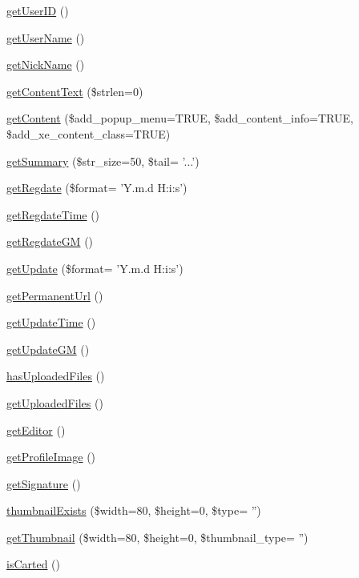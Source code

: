 \begin{DoxyCompactItemize}
\hyperlink{classcommentItem_a5c793e6542e731da5d465c35c77b42fd}{get\-User\-I\-D} ()
\item 
\hyperlink{classcommentItem_a1c35032d37e80ad5018a02787f0091fe}{get\-User\-Name} ()
\item 
\hyperlink{classcommentItem_a097673677cd1c461040cbc9275b7fca9}{get\-Nick\-Name} ()
\item 
\hyperlink{classcommentItem_a5bd758e385068bff00ffc35a0737ff72}{get\-Content\-Text} (\$strlen=0)
\item 
\hyperlink{classcommentItem_afae7151c28cc9066f9c40a010597b25a}{get\-Content} (\$add\-\_\-popup\-\_\-menu=T\-R\-U\-E, \$add\-\_\-content\-\_\-info=T\-R\-U\-E, \$add\-\_\-xe\-\_\-content\-\_\-class=T\-R\-U\-E)
\item 
\hyperlink{classcommentItem_aabe11142b19d831c5e3120e48bb169f7}{get\-Summary} (\$str\-\_\-size=50, \$tail= '...')
\item 
\hyperlink{classcommentItem_acae004be4282c96181e79cc0f3b3adfa}{get\-Regdate} (\$format= 'Y.\-m.\-d H\-:i\-:s')
\item 
\hyperlink{classcommentItem_adb5754f10a245c54a0beb4f6fb22f0e3}{get\-Regdate\-Time} ()
\item 
\hyperlink{classcommentItem_ae5f0203691b6d16a2d99ae40d67adb3f}{get\-Regdate\-G\-M} ()
\item 
\hyperlink{classcommentItem_aa7a413ef04f4c64c779a8bb119a5c214}{get\-Update} (\$format= 'Y.\-m.\-d H\-:i\-:s')
\item 
\hyperlink{classcommentItem_adc6e6a36fd7c02a2f0fecc8a22f9b13b}{get\-Permanent\-Url} ()
\item 
\hyperlink{classcommentItem_a59d0264c1b6842c6a0dfa21a6dfe1edb}{get\-Update\-Time} ()
\item 
\hyperlink{classcommentItem_aab0135e2edd37a47cc390da9b4c79dfa}{get\-Update\-G\-M} ()
\item 
\hyperlink{classcommentItem_abe1774ffe4e8c0f5c14822c5698433da}{has\-Uploaded\-Files} ()
\item 
\hyperlink{classcommentItem_aaa9c1ef5cfd0ce69fd83d8d980360ee5}{get\-Uploaded\-Files} ()
\item 
\hyperlink{classcommentItem_aa27b1c1916b9df510c495655af07bfdf}{get\-Editor} ()
\item 
\hyperlink{classcommentItem_a9baa56f4aa9515c433494778e75c9e85}{get\-Profile\-Image} ()
\item 
\hyperlink{classcommentItem_a97eea3e5359c0ffe84db781d5e5fbff6}{get\-Signature} ()
\item 
\hyperlink{classcommentItem_a1523ec4128cf464d13ca1fb1c2078a0f}{thumbnail\-Exists} (\$width=80, \$height=0, \$type= '')
\item 
\hyperlink{classcommentItem_a9ba96d0703304547c3f494403a86e522}{get\-Thumbnail} (\$width=80, \$height=0, \$thumbnail\-\_\-type= '')
\item 
\hyperlink{classcommentItem_aee548a05480bd060de454017aa8be318}{is\-Carted} ()
\end{DoxyCompactItemize}
